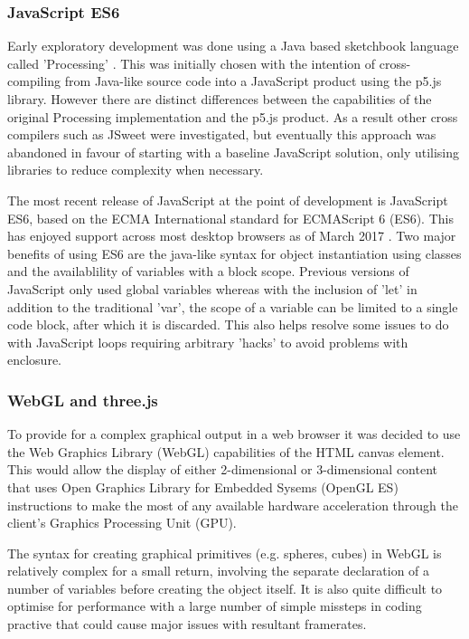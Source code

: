 \documentclass[twoside]{bhamthesis}
\begin{document}
\subsubsection{JavaScript ES6}
Early exploratory development was done using a Java based sketchbook language called 'Processing' \cite{fry_processing.org_????}. This was initially chosen with the intention of cross-compiling from Java-like source code into a JavaScript product using the p5.js library. However there are distinct differences between the capabilities of the original Processing implementation and the p5.js product. As a result other cross compilers such as JSweet \cite{pawlak_jsweet:_????} were investigated, but eventually this approach was abandoned in favour of starting with a baseline JavaScript solution, only utilising libraries to reduce complexity when necessary.

The most recent release of JavaScript at the point of development is JavaScript ES6, based on the ECMA International standard for ECMAScript 6 (ES6). This has enjoyed support across most desktop browsers as of March 2017 \cite{zaytsev_ecmascript_2017}. Two major benefits of using ES6 are the java-like syntax for object instantiation using classes and the availablility of variables with a block scope. Previous versions of JavaScript only used global variables whereas with the inclusion of 'let' in addition to the traditional 'var', the scope of a variable can be limited to a single code block, after which it is discarded. This also helps resolve some issues to do with JavaScript loops requiring arbitrary 'hacks' to avoid problems with enclosure.


\subsubsection{WebGL and three.js}
To provide for a complex graphical output in a web browser it was decided to use the Web Graphics Library (WebGL) capabilities of the HTML canvas element. This would allow the display of either 2-dimensional or 3-dimensional content that uses Open Graphics Library for Embedded Sysems (OpenGL ES) instructions to make the most of any available hardware acceleration through the client's Graphics Processing Unit (GPU).

The syntax for creating graphical primitives (e.g. spheres, cubes) in WebGL is relatively complex for a small return, involving the separate declaration of a number of variables before creating the object itself. It is also quite difficult to optimise for performance with a large number of simple missteps in coding practive that could cause major issues with resultant framerates.
\end{document}
